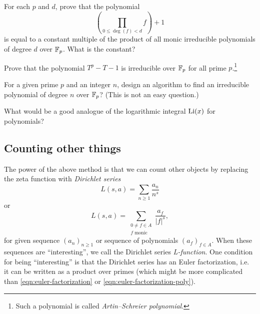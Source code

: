 \begin{exercise}
    For each $p$ and $d$, prove that the polynomial
    \[
    \left(\prod_{0 \le \deg(f) < d} f\right) + 1
    \]
    is equal to a constant multiple of the product of all monic irreducible polynomials of degree $d$ over $\mathbb{F}_p$.
    What is the constant?
\end{exercise}

\begin{exercise}
    Prove that the polynomial $T^p - T - 1$ is irreducible over $\mathbb{F}_p$ for all prime $p$.\footnote{Such a polynomial is called \emph{Artin--Schreier polynomial}.}
\end{exercise}

\begin{exercise}\sage
    For a given prime $p$ and an integer $n$, design an algorithm to find an irreducible polynomial of degree $n$ over $\mathbb{F}_p$? (This is not an easy question.)
\end{exercise}

\begin{exercise}
    What would be a good analogue of the logarithmic integral $\mathrm{Li}(x)$ for polynomials?
\end{exercise}


\subsection{Counting other things}

The power of the above method is that we can count other objects by replacing the zeta function with \emph{Dirichlet series}
\begin{equation}
    L(s, a) = \sum_{n \ge 1} \frac{a_n}{n^s}
    \label{eqn:dirichlet_series}
\end{equation}
or
\begin{equation}
    L(s, a) = \sum_{\substack{0 \ne f \in A \\ f \text{ monic}}} \frac{a_f}{|f|^s},
    \label{eqn:dirichlet_series_poly}
\end{equation}
for given sequence $(a_n)_{n \ge 1}$ or sequence of polynomials $(a_f)_{f \in A}$.
When these sequences are ``interesting'', we call the Dirichlet series \emph{L-function}.
One condition for being ``interesting'' is that the Dirichlet series has an Euler factorization, i.e. it can be written as a product over primes (which might be more complicated than \eqref{eqn:euler-factorization} or \eqref{eqn:euler-factorization-poly}).

